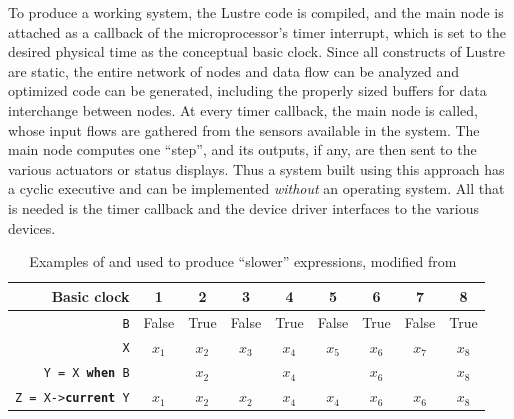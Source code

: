 To produce a working system, the Lustre code is compiled, and the main
node is attached as a callback of the microprocessor's timer
interrupt, which is set to the desired physical time as the conceptual
basic clock. Since all constructs of Lustre are static, the entire
network of nodes and data flow can be analyzed and optimized code can
be generated, including the properly sized buffers for data
interchange between nodes. At every timer callback, the main node is
called, whose input flows are gathered from the sensors available in
the system. The main node computes one ``step'', and its outputs, if
any, are then sent to the various actuators or status displays. Thus a
system built using this approach has a cyclic executive and can be
implemented \emph{without} an operating system. All that is needed is
the timer callback and the device driver interfaces to the various
devices.

\begin{table}
\centering
\begin{tabular}{r|c|c|c|c|c|c|c|c}
\hline
Basic clock & 1 & 2 & 3 & 4 & 5 & 6 & 7 & 8\\
\hline
\texttt{B} & False & True & False & True & False & True & False & True\\
\hline
\texttt{X} & $x_1$ & $x_2$ & $x_3$ & $x_4$ & $x_5$ & $x_6$ & $x_7$ & $x_8$\\
\hline
\texttt{Y = X \textbf{when} B} & & $x_2$ & & $x_4$ & & $x_6$ & & $x_8$\\
\hline
\texttt{Z = X->\textbf{current} Y} & $x_1$ & $x_2$ & $x_2$ & $x_4$ & $x_4$ & $x_6$ &
$x_6$ & $x_8$\\
\hline
\end{tabular}
\caption{Examples of  and  used to produce
  ``slower'' expressions, modified from~\cite{halbwachs@ieee91}}
\label{tab:lustre_whencurrent}
\end{table}

